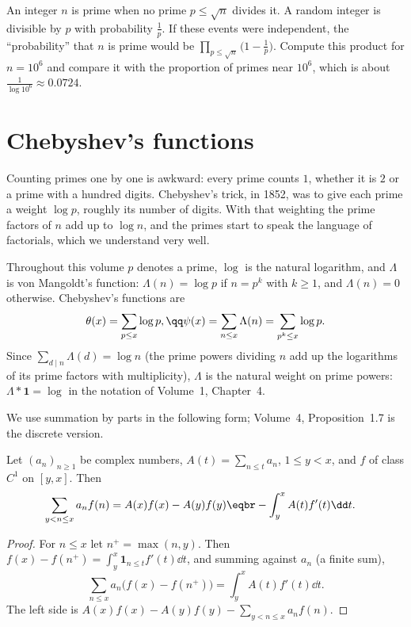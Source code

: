 \begin{think}
An integer $n$ is prime when no prime $p\le\sqrt n$ divides it. A random integer is divisible by $p$ with probability $\frac1p$. If
these events were independent, the ``probability'' that $n$ is prime would be $\prod_{p\le\sqrt n}\bigl(1-\frac1p\bigr)$. Compute this product for
$n=10^6$ and compare it with the proportion of primes near $10^6$, which is about $\frac1{\log10^6}\approx0.0724$.
\end{think}

\section{Chebyshev's functions}

Counting primes one by one is awkward: every prime counts $1$, whether it is $2$ or a prime with a hundred digits. Chebyshev's trick, in 1852,
was to give each prime a weight $\log p$, roughly its number of digits. With that weighting the prime factors of $n$ add up to $\log n$, and the
primes start to speak the language of factorials, which we understand very well.

Throughout this volume $p$ denotes a prime, $\log$ is the natural logarithm, and $\Lambda$ is von Mangoldt's function:
$\Lambda(n)=\log p$ if $n=p^k$ with $k\ge1$, and $\Lambda(n)=0$ otherwise. Chebyshev's functions are
\[
\begin{gathered}\theta(x)=\sum_{p\le x}\log p,\qq\psi(x)=\sum_{n\le x}\Lambda(n)=\sum_{p^k\le x}\log p.\end{gathered}
\]
Since $\sum_{d\mid n}\Lambda(d)=\log n$ (the prime powers dividing $n$ add up the logarithms of its prime factors with multiplicity),
$\Lambda$ is the natural weight on prime powers: $\Lambda*\mathbf1=\log$ in the notation of Volume~1, Chapter~4.

We use summation by parts in the following form; Volume~4, Proposition~1.7 is the discrete version.

\begin{lemma}\label{lem:abelint}
Let $(a_n)_{n\ge1}$ be complex numbers, $A(t)=\sum_{n\le t}a_n$, $1\le y<x$, and $f$ of class $C^1$ on $[y,x]$. Then
\[
\begin{aligned}\sum_{y<n\le x}a_nf(n)&=A(x)f(x)-A(y)f(y)\eqbr-\int_y^xA(t)f'(t)\dd t.\end{aligned}
\]
\end{lemma}
\begin{proof}
For $n\le x$ let $n^+=\max(n,y)$. Then $f(x)-f(n^+)=\int_y^x\mathbf1_{n\le t}f'(t)\dd t$, and summing against $a_n$ (a finite sum),
\[
\sum_{n\le x}a_n\bigl(f(x)-f(n^+)\bigr)=\int_y^xA(t)f'(t)\dd t.
\]
The left side is $A(x)f(x)-A(y)f(y)-\sum_{y<n\le x}a_nf(n)$.
\end{proof}

